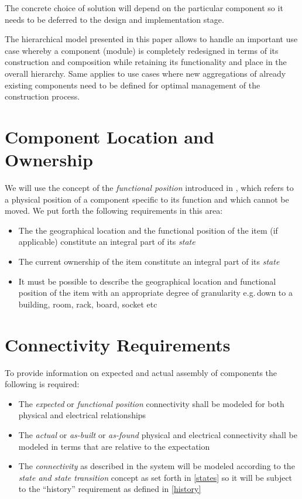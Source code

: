 \documentclass[pdftex,12pt,letter]{article}
\begin{document}
\noindent The concrete choice of solution will depend on the particular component so it needs to be deferred to the
design and implementation stage.

The hierarchical model presented in this paper allows to handle an important use case whereby a component (module)
is completely redesigned in terms of its construction and composition while retaining its functionality and 
place in the overall hierarchy. Same applies to use cases where new aggregations of already existing components
need to be defined for optimal management of the construction process.



\section{Component Location and Ownership}

We will use the concept of the \textit{functional position} introduced in \cite{atlasequipmentdb}, which refers
to a physical position of a component specific to its function and which cannot be moved. We put forth the
following requirements in this area:
\begin{itemize}

\item The  the geographical location and the functional position of the item (if applicable) constitute an integral part of its \textit{state}

\item The current ownership of the item constitute an integral part of its \textit{state}

\item It must be possible to describe the geographical location and functional position of the item with an appropriate
degree of granularity e.g.\,down to a building, room, rack, board, socket etc

\end{itemize}

\section{Connectivity Requirements}
To provide information on expected and actual assembly of components
the following is required:

\begin{itemize}

\item The \textit{expected} or \textit{functional position} connectivity shall be
 modeled for both physical and electrical relationships

\item The \textit{actual} or \textit{as-built} or \textit{as-found} physical and electrical
connectivity shall be modeled in terms that are relative to the expectation

\item The \textit{connectivity} as described in the system will be modeled according to the \textit{state and state transition}
concept as set forth in \ref{states} so it will be subject to the ``history'' requirement as defined in \ref{history}
 
\end{itemize}
\end{document}
